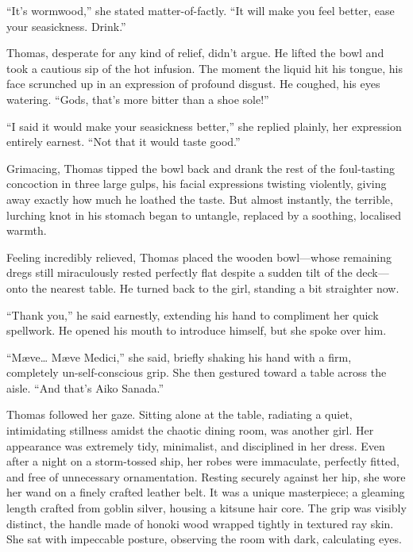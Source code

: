 \enquote{It's wormwood,} she stated matter-of-factly. \enquote{It will make you feel better, ease your seasickness. Drink.}

Thomas, desperate for any kind of relief, didn't argue. He lifted the bowl and took a cautious sip of the hot infusion. The moment the liquid hit his tongue, his face scrunched up in an expression of profound disgust. He coughed, his eyes watering. \enquote{Gods, that's more bitter than a shoe sole!}

\enquote{I said it would make your seasickness better,} she replied plainly, her expression entirely earnest. \enquote{Not that it would taste good.}

Grimacing, Thomas tipped the bowl back and drank the rest of the foul-tasting concoction in three large gulps, his facial expressions twisting violently, giving away exactly how much he loathed the taste. But almost instantly, the terrible, lurching knot in his stomach began to untangle, replaced by a soothing, localised warmth.

Feeling incredibly relieved, Thomas placed the wooden bowl---whose remaining dregs still miraculously rested perfectly flat despite a sudden tilt of the deck---onto the nearest table. He turned back to the girl, standing a bit straighter now.

\enquote{Thank you,} he said earnestly, extending his hand to compliment her quick spellwork. He opened his mouth to introduce himself, but she spoke over him.

\enquote{Mæve\ldots{} Mæve Medici,} she said, briefly shaking his hand with a firm, completely un-self-conscious grip. She then gestured toward a table across the aisle. \enquote{And that's Aiko Sanada.}

Thomas followed her gaze. Sitting alone at the table, radiating a quiet, intimidating stillness amidst the chaotic dining room, was another girl. Her appearance was extremely tidy, minimalist, and disciplined in her dress. Even after a night on a storm-tossed ship, her robes were immaculate, perfectly fitted, and free of unnecessary ornamentation. Resting securely against her hip, she wore her wand on a finely crafted leather belt. It was a unique masterpiece; a gleaming length crafted from goblin silver, housing a kitsune hair core. The grip was visibly distinct, the handle made of honoki wood wrapped tightly in textured ray skin. She sat with impeccable posture, observing the room with dark, calculating eyes.

